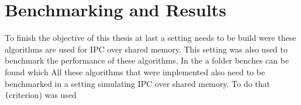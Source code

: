 \chapter{Benchmarking and Results}\label{ch:results}
To finish the objective of this thesis at last a setting needs to be build were these algorithms are used for \ac{IPC} over shared memory. This setting was also used to benchmark the performance of these algorithms. In the \cite{githubMA} a folder benches can be found which All these algorithms that were implemented also need to be benchmarked in a setting simulating \ac{IPC} over shared memory. To do that \texttt(criterion) was used 